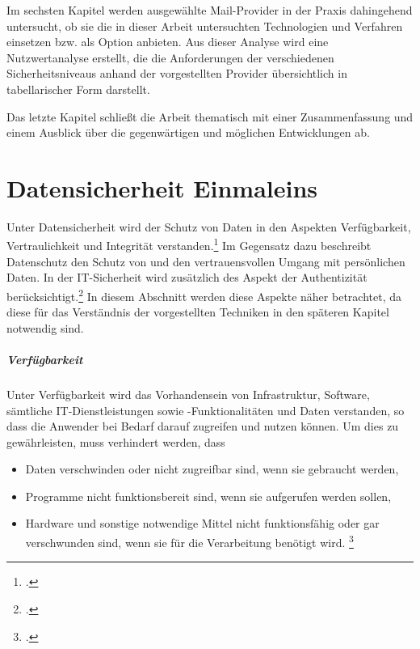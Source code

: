 \documentclass  [paper=a4,
				fontsize=12pt,
				listof=totoc,
				bibliography=totoc
				]{scrreprt}
\begin{document}
		Im sechsten Kapitel werden ausgewählte Mail-Provider in der Praxis dahingehend untersucht, ob sie die in dieser Arbeit untersuchten Technologien und Verfahren einsetzen bzw. als Option anbieten. Aus dieser Analyse wird eine Nutzwertanalyse erstellt, die die Anforderungen der verschiedenen Sicherheitsniveaus anhand der vorgestellten Provider übersichtlich in tabellarischer Form darstellt.
		
		Das letzte Kapitel schließt die Arbeit thematisch mit einer Zusammenfassung und einem Ausblick über die gegenwärtigen und möglichen Entwicklungen ab.
		
		

	\chapter{Datensicherheit Einmaleins}
	Unter Datensicherheit wird der Schutz von Daten in den Aspekten Verfügbarkeit, Vertraulichkeit und Integrität verstanden.\footcite[Vgl.][]{BSI2014} Im Gegensatz dazu beschreibt Datenschutz den Schutz von und den vertrauensvollen Umgang mit persönlichen Daten. In der IT-Sicherheit wird zusätzlich des Aspekt der Authentizität berücksichtigt.\footcite[Vgl.][]{Berliner2014} In diesem Abschnitt werden diese Aspekte näher betrachtet, da diese für das Verständnis der vorgestellten Techniken in den späteren Kapitel notwendig sind.
	
	\paragraph{Verfügbarkeit}
	
	Unter Verfügbarkeit wird das Vorhandensein von Infrastruktur, Software, sämtliche IT-Dienstleistungen sowie -Funktionalitäten und Daten verstanden, so dass die Anwender bei Bedarf darauf zugreifen und nutzen können. Um dies zu gewährleisten, muss verhindert werden, dass
	\begin{itemize}
	\item Daten verschwinden oder nicht zugreifbar sind, wenn sie gebraucht werden,
	\item Programme nicht funktionsbereit sind, wenn sie aufgerufen werden sollen,
	\item Hardware und sonstige notwendige Mittel nicht funktionsfähig oder gar verschwunden sind, wenn sie für die Verarbeitung benötigt wird. \footcite[Vgl.][]{Berliner2014}
	\end{itemize}
	
\end{document}
